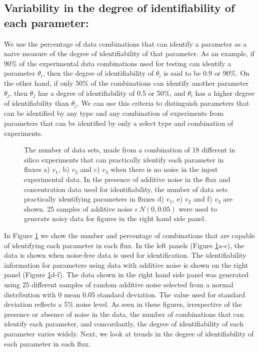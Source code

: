 \documentclass[10pt]{article}
\begin{document}
\subsection{Variability in the degree of identifiability of each parameter:}
We use the percentage of data combinations that can identify a parameter as a naive measure of the degree of identifiability of that parameter. As an example, if 90\% of the experimental data combinations used for testing can identify a parameter $\theta_i$, then the degree of identifiability of $\theta_i$ is said to be 0.9 or 90\%. On the other hand, if only 50\% of the combinations can identify another parameter $\theta_j$, then $\theta_j$ has a degree of identifiability of 0.5 or 50\%, and $\theta_i$ has a higher degree of identifiability than $\theta_j$. We can use this criteria to distinguish parameters that can be identified by any type and any combination of experiments from parameters that can be identified by only a select type and combination of experiments.
\begin{figure}[!tbhp]
	\caption{The number of data sets, made from a combination of 18 different in silico experiments that can practically identify each parameter in fluxes a) $v_1$, b) $v_2$ and c) $v_3$ when there is no noise in the input experimental data. In the presence of additive noise in the flux and concentration data used for identifiability, the number of data sets practically identifying parameters in fluxes d) $v_1$, e) $v_2$ and f) $v_3$ are shown. 25 samples of additive noise $\epsilon ~ N(0, 0.05)$ were used to generate noisy data for figures in the right hand side panel.}\label{fig:figure1}
\end{figure}

In Figure \ref{fig:figure1} we show the number and percentage of combinations that are capable of identifying each parameter in each flux. In the left panels (Figure \ref{fig:figure1}a-c), the data is shown when noise-free data is used for identification. The identifiability information for parameters using data with additive noise is shown on the right panel (Figure \ref{fig:figure1}d-f). The data shown in the right hand side panel was generated using 25 different samples of random additive noise selected from a normal distribution with 0 mean 0.05 standard deviation. The value used for standard deviation reflects a 5\% noise level. As seen in these figures, irrespective of the presence or absence of noise in the data, the number of combinations that can identify each parameter, and concordantly, the degree of identifiability of each parameter varies widely. Next, we look at trends in the degree of identifiability of each parameter in each flux.
\end{document}
